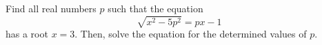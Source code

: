Find all real numbers $p$ such that the equation $$\sqrt{x^2-5p^2}=px-1$$has a root $x=3$. Then, solve the equation for the determined values of $p$.